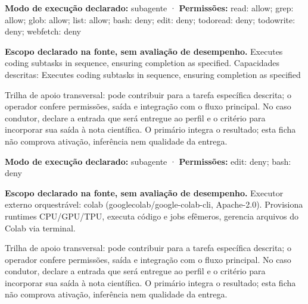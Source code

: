 \begin{arquitetura}
\textbf{Modo de execução declarado:} subagente · \textbf{Permissões:} read: allow; grep: allow; glob: allow; list: allow; bash: deny; edit: deny; todoread: deny; todowrite: deny; webfetch: deny
\end{arquitetura}


\begin{descricao}
\textbf{Escopo declarado na fonte, sem avaliação de desempenho.}
Executes coding subtasks in sequence, ensuring completion as specified. Capacidades descritas: Executes coding subtasks in sequence, ensuring completion as specified
\end{descricao}

\begin{funcao}
Trilha de apoio transversal: pode contribuir para a tarefa específica descrita; o operador confere permissões, saída e integração com o fluxo principal. No caso condutor, declare a entrada que será entregue ao perfil e o critério para incorporar sua saída à nota científica. O primário integra o resultado; esta ficha não comprova ativação, inferência nem qualidade da entrega.
\end{funcao}

\begin{arquitetura}
\textbf{Modo de execução declarado:} subagente · \textbf{Permissões:} edit: deny; bash: deny
\end{arquitetura}


\begin{descricao}
\textbf{Escopo declarado na fonte, sem avaliação de desempenho.}
Executor externo orquestrável: colab (googlecolab/google-colab-cli, Apache-2.0). Provisiona runtimes CPU/GPU/TPU, executa código e jobs efêmeros, gerencia arquivos do Colab via terminal.
\end{descricao}

\begin{funcao}
Trilha de apoio transversal: pode contribuir para a tarefa específica descrita; o operador confere permissões, saída e integração com o fluxo principal. No caso condutor, declare a entrada que será entregue ao perfil e o critério para incorporar sua saída à nota científica. O primário integra o resultado; esta ficha não comprova ativação, inferência nem qualidade da entrega.
\end{funcao}

